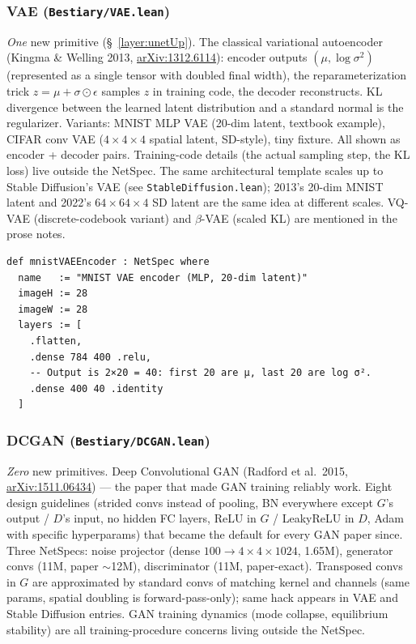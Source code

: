 \subsubsection*{VAE (\texttt{Bestiary/VAE.lean})}
\emph{One} new primitive (\S~\ref{layer:unetUp}). The classical variational autoencoder
(Kingma \& Welling 2013, \href{https://arxiv.org/abs/1312.6114}{arXiv:1312.6114}): encoder outputs
$(\mu, \log \sigma^2)$ (represented as a single tensor with doubled
final width), the reparameterization trick
$z = \mu + \sigma \odot \epsilon$ samples $z$ in training code, the
decoder reconstructs. KL divergence between the learned latent
distribution and a standard normal is the regularizer. Variants:
MNIST MLP VAE (20-dim latent, textbook example), CIFAR conv VAE
($4 \times 4 \times 4$ spatial latent, SD-style), tiny fixture. All
shown as encoder + decoder pairs. Training-code details (the actual
sampling step, the KL loss) live outside the NetSpec. The same
architectural template scales up to Stable Diffusion's VAE (see
\texttt{StableDiffusion.lean}); 2013's 20-dim MNIST latent and
2022's $64 \times 64 \times 4$ SD latent are the same idea at
different scales. VQ-VAE (discrete-codebook variant) and $\beta$-VAE
(scaled KL) are mentioned in the prose notes.

\begin{verbatim}
def mnistVAEEncoder : NetSpec where
  name   := "MNIST VAE encoder (MLP, 20-dim latent)"
  imageH := 28
  imageW := 28
  layers := [
    .flatten,
    .dense 784 400 .relu,
    -- Output is 2×20 = 40: first 20 are μ, last 20 are log σ².
    .dense 400 40 .identity
  ]
\end{verbatim}

\subsubsection*{DCGAN (\texttt{Bestiary/DCGAN.lean})}
\emph{Zero} new primitives. Deep Convolutional GAN (Radford et
al.\ 2015, \href{https://arxiv.org/abs/1511.06434}{arXiv:1511.06434}) --- the paper that made GAN training reliably work. Eight
design guidelines (strided convs instead of pooling, BN everywhere
except $G$'s output / $D$'s input, no hidden FC layers, ReLU in $G$
/ LeakyReLU in $D$, Adam with specific hyperparams) that became the
default for every GAN paper since. Three NetSpecs: noise projector
(dense $100 \to 4 \times 4 \times 1024$, 1.65M), generator convs
(11M, paper $\sim$12M), discriminator (11M, paper-exact). Transposed
convs in $G$ are approximated by standard convs of matching kernel
and channels (same params, spatial doubling is forward-pass-only);
same hack appears in VAE and Stable Diffusion entries. GAN training
dynamics (mode collapse, equilibrium stability) are all
training-procedure concerns living outside the NetSpec.

